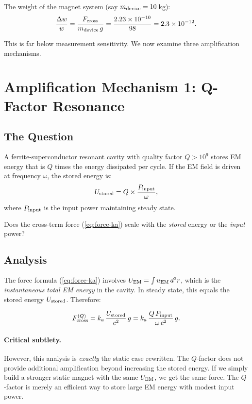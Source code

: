 \documentclass[11pt]{article}
\newcommand{\ka}{k_a}
\begin{document}
The weight of the magnet system (say $m_{\rm device} = 10$\,kg):
\begin{equation}
\frac{\Delta w}{w} = \frac{F_{\rm cross}}{m_{\rm device}\,g}
  = \frac{2.23 \times 10^{-10}}{98} = 2.3 \times 10^{-12}.
\end{equation}

This is far below measurement sensitivity. We now examine three
amplification mechanisms.


\section{Amplification Mechanism 1: Q-Factor Resonance}\label{sec:Q-amp}

\subsection{The Question}

A ferrite-superconductor resonant cavity with quality factor $Q > 10^9$
stores EM energy that is $Q$ times the energy dissipated per cycle.
If the EM field is driven at frequency $\omega$, the stored energy is:
\begin{equation}
U_{\rm stored} = Q \times \frac{P_{\rm input}}{\omega},
\end{equation}
where $P_{\rm input}$ is the input power maintaining steady state.

Does the cross-term force (\ref{eq:force-ka}) scale with the
\textit{stored} energy or the \textit{input} power?

\subsection{Analysis}

The force formula (\ref{eq:force-ka}) involves $U_{\rm EM} = \int u_{\rm EM}\,d^3r$,
which is the \textit{instantaneous total EM energy} in the cavity. In steady
state, this equals the stored energy $U_{\rm stored}$. Therefore:

\begin{equation}\label{eq:Q-force}
F_{\rm cross}^{(Q)} = \ka\,\frac{U_{\rm stored}}{c^2}\,g
  = \ka\,\frac{Q\,P_{\rm input}}{\omega\,c^2}\,g.
\end{equation}

\paragraph{Critical subtlety.}
However, this analysis is \textit{exactly} the static case rewritten.
The $Q$-factor does not provide additional amplification beyond increasing
the stored energy. If we simply build a stronger static magnet with the
same $U_{\rm EM}$, we get the same force. The $Q$-factor is merely an
efficient way to store large EM energy with modest input power.
\end{document}
